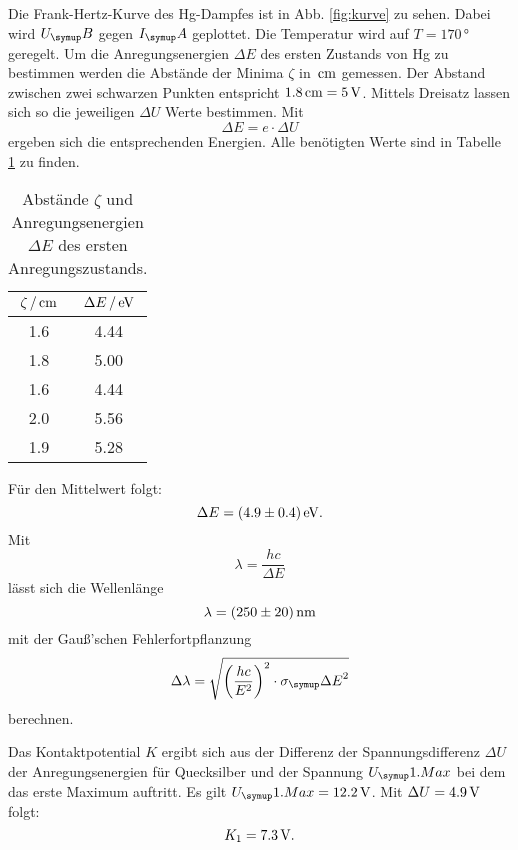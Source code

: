 Die Frank-Hertz-Kurve des Hg-Dampfes ist in Abb. \ref{fig:kurve} zu sehen.
Dabei wird $U_\su{B}$ gegen $I_\su{A}$ geplottet.
Die Temperatur wird auf $T=170\,\si{\degree}$ geregelt. Um die Anregungsenergien
$\Delta E$
des ersten Zustands von Hg zu bestimmen werden die Abstände der Minima $\zeta$ in
$\,\si{\centi\meter}$ gemessen. Der Abstand zwischen zwei schwarzen Punkten entspricht
$1.8\,\si{\centi\meter} = 5\,\si{\volt}$. Mittels Dreisatz lassen sich so die jeweiligen $\Delta U$
Werte bestimmen. Mit
\begin{equation}
  \Delta E = e\cdot \Delta U
\end{equation}
ergeben sich die entsprechenden Energien. Alle benötigten Werte sind in Tabelle
\ref{tab:werte} zu finden.
\begin{table}
  \centering
  \begin{tabular}{c c}
    \toprule
    $\zeta \,/\,\si{\centi\meter}$   & $\Delta E \,/\,\si{\electronvolt}$  \\
    \midrule
    1.6 & 4.44 \\
    1.8 & 5.00 \\
    1.6 & 4.44 \\
    2.0 & 5.56 \\
    1.9 & 5.28 \\
    \bottomrule
  \end{tabular}
  \caption{Abstände $\zeta$ und Anregungsenergien $\Delta E$ des ersten Anregungszustands.}
  \label{tab:werte}
\end{table}
Für den Mittelwert folgt:
\begin{equation*}
  \Delta E = (4.9 \pm 0.4) \,\si{\electronvolt}.
\end{equation*}
Mit
\begin{equation}
  \lambda = \frac{hc}{\Delta E} \label{eqn:lambda}
\end{equation}
lässt sich die Wellenlänge
\begin{equation*}
  \lambda = (250 \pm 20)\,\si{\nano\meter}
\end{equation*}
mit der Gauß'schen Fehlerfortpflanzung
\begin{equation*}
  \Delta \lambda = \sqrt{\bigg(\frac{hc}{E^2}\bigg)^2\cdot \sigma_\su{\Delta E}^2}
\end{equation*}
berechnen.

Das Kontaktpotential $K$ ergibt sich aus der Differenz der Spannungsdifferenz $\Delta U$
der Anregungsenergien für Quecksilber und der Spannung $U_\su{1.Max}$ bei dem das
erste Maximum auftritt. Es gilt $U_\su{1.Max} = 12.2\Volt$. Mit $\Delta U = 4.9\,\si{\volt}$
folgt:
\begin{equation}
  K_1 = 7.3\,\si{\volt}.
\end{equation}

